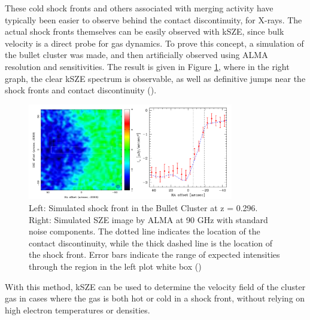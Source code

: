 \documentclass[manuscript]{aastex}
\begin{document}
These cold shock fronts and others associated with merging activity have typically been easier to observe behind the contact discontinuity, for X-rays. The actual shock fronts themselves can be easily observed with kSZE, since bulk velocity is a direct probe for gas dynamics. To prove this concept, a simulation of the bullet cluster was made, and then artificially observed using ALMA resolution and sensitivities. The result is given in Figure \ref{fig:bulletcluster}, where in the right graph, the clear kSZE spectrum is observable, as well as definitive jumps near the shock fronts and contact discontinuity (\cite{Kitayama2014}). 

\begin{figure}[H]
\centering
\captionsetup{width=0.8\textwidth}
\includegraphics[width=0.8\textwidth]{bulletcluster.png}
\caption[ Bullet Cluster Simulated Shock Front kSZE Detection -(\cite{Kitayama2014})]{Left: Simulated shock front in the Bullet Cluster at z = 0.296. Right: Simulated SZE image by ALMA at 90 GHz with standard noise components. The dotted line indicates the location of the contact discontinuity, while the thick dashed line is the location of the shock front. Error bars indicate the range of expected intensities through the region in the left plot white box (\cite{Kitayama2014})}
\label{fig:bulletcluster}
\end{figure}
With this method, kSZE can be used to determine the velocity field of the cluster gas in cases where the gas is both hot or cold in a shock front, without relying on high electron temperatures or densities. 

\end{document}
